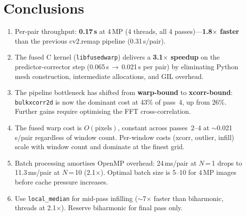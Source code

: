 \documentclass[10pt,a4paper,twocolumn]{article}
\begin{document}
\section{Conclusions}

\begin{enumerate}[leftmargin=1.4em]
\item Per-pair throughput: \textbf{0.17\,s} at 4\,MP (4 threads, all 4 passes)---\textbf{1.8$\times$ faster} than the previous cv2.remap pipeline (0.31\,s/pair).
\item The fused C kernel (\texttt{libfusedwarp}) delivers a \textbf{3.1$\times$ speedup} on the predictor-corrector step (0.065\,s\,$\to$\,0.021\,s per pair) by eliminating Python mesh construction, intermediate allocations, and GIL overhead.
\item The pipeline bottleneck has shifted from \textbf{warp-bound} to \textbf{xcorr-bound}: \texttt{bulkxcorr2d} is now the dominant cost at 43\% of pass~4, up from 26\%. Further gains require optimising the FFT cross-correlation.
\item The fused warp cost is $O(\text{pixels})$, constant across passes~2--4 at ${\sim}$0.021\,s/pair regardless of window count. Per-window costs (xcorr, outlier, infill) scale with window count and dominate at the finest grid.
\item Batch processing amortises OpenMP overhead: 24\,ms/pair at $N$\,=\,1 drops to 11.3\,ms/pair at $N$\,=\,10 (2.1$\times$). Optimal batch size is 5--10 for 4\,MP images before cache pressure increases.
\item Use \texttt{local\_median} for mid-pass infilling (${\sim}$7$\times$ faster than biharmonic, threads at 2.1$\times$). Reserve biharmonic for final pass only.
\end{enumerate}
\end{document}
